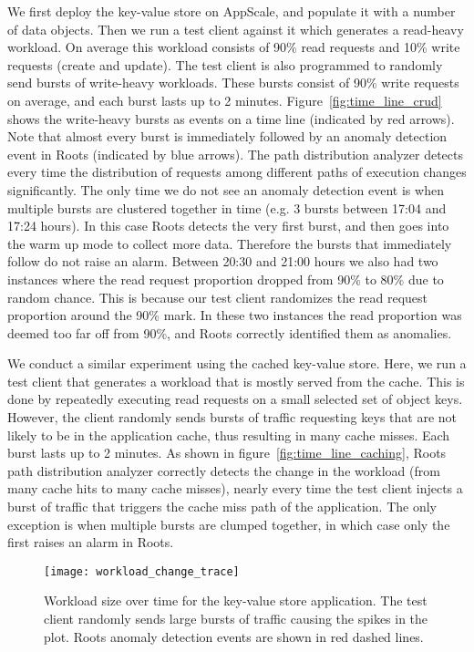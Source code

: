 We first deploy the key-value store on AppScale, and populate it with a number of data objects. Then we
run a test client against it which generates a read-heavy workload. On average this workload
consists of 90\% read requests and 10\% write requests (create and update). The test client
is also programmed to randomly send bursts of write-heavy workloads. These bursts consist
of 90\% write requests on average, and each burst lasts up to 2 minutes. Figure~\ref{fig:time_line_crud}
shows the write-heavy bursts as events on a time line (indicated by red arrows). Note that almost every burst is
immediately followed by an anomaly detection event in Roots (indicated by blue arrows). The path
distribution analyzer detects every time the distribution of requests among different paths of execution
changes significantly. The only time we do not see an anomaly detection event is when multiple
bursts are clustered together in time (e.g. 3 bursts between 17:04 and 17:24 hours). In this
case Roots detects the very first burst, and then goes into the warm up mode to collect more data. Therefore
the bursts that immediately follow do not raise an alarm. Between 20:30 and 21:00 hours we also
had two instances where the read request proportion dropped from 90\% to 80\% due to random
chance. This is because our test client randomizes the read request proportion around the 90\% mark. 
In these two instances the read proportion was deemed too far off from 90\%, and Roots correctly 
identified them as anomalies.

We conduct a similar experiment using the cached key-value store. Here, we run a test client that generates a workload
that is mostly served from the cache. This is done by repeatedly executing read requests on a small
selected set of object keys. However, the client randomly sends bursts of traffic requesting keys that
are not likely to be in the application cache, thus resulting in many cache misses. Each burst
lasts up to 2 minutes. As shown in 
figure~\ref{fig:time_line_caching}, Roots path distribution analyzer correctly detects the change 
in the workload (from many cache hits to many cache misses), nearly every time the test client injects a 
burst of traffic that triggers the cache miss path of the application. The only exception is when
multiple bursts are clumped together, in which case only the first raises an alarm in Roots.

\begin{figure}
\centering
\texttt{[image: workload\_change\_trace]}
\caption{Workload size over time for the key-value store application. The test client randomly sends
large bursts of traffic causing the spikes in the plot. Roots anomaly detection events are shown
in red dashed lines.}
\label{fig:workload_change}
\end{figure}


